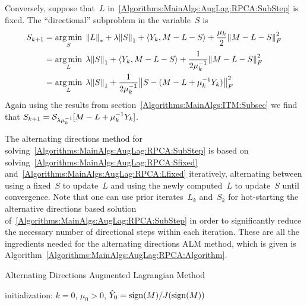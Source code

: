 \documentclass{../../common/projectreport}
\begin{document}
Conversely, suppose that~$L$ in~\eqref{Algorithms:MainAlgs:AugLag:RPCA:SubStep} is fixed. The ``directional'' subproblem in the variable~$S$ is
%
\begin{align}
\begin{split}
S_{k+1} &= \operatorname*{arg\,min}_{S} \; {\left\|L\right\|}_{*}^{} + \lambda {\left\|S\right\|}_{1}^{} + \langle Y_k, M-L-S \rangle + \frac{\mu_k}{2} {\left\|M-L-S\right\|}_{F}^{2} \\
&= \operatorname*{arg\,min}_{L} \; \lambda {\left\|S\right\|}_{1}^{} + \langle Y_k, M-L-S \rangle + \frac{1}{2\mu_k^{-1}} {\left\|M-L-S\right\|}_{F}^{2} \\
&= \operatorname*{arg\,min}_{L} \; \lambda {\left\|S\right\|}_{1}^{} + \frac{1}{2\mu_k^{-1}} {\left\|S-(M-L+\mu_k^{-1}Y_k)\right\|}_{F}^{2} 
\end{split}
\label{Algorithms:MainAlgs:AugLag:RPCA:Lfixed}
\end{align}
%
Again using the results from section~\ref{Algorithms:MainAlgs:ITM:Subsec} we find that $S_{k+1} = {\mathcal{S}}_{\lambda\mu_k^{-1}}[M-L+\mu_k^{-1}Y_k]$. 

The alternating directions method for solving~\eqref{Algorithms:MainAlgs:AugLag:RPCA:SubStep} is based on solving~\eqref{Algorithms:MainAlgs:AugLag:RPCA:Sfixed} and~\eqref{Algorithms:MainAlgs:AugLag:RPCA:Lfixed} iteratively, alternating between using a fixed~$S$ to update~$L$ and using the newly computed~$L$ to update~$S$ until convergence. Note that one can use prior iterates~$L_k$ and~$S_k$ for hot-starting the alternative directions based solution of~\eqref{Algorithms:MainAlgs:AugLag:RPCA:SubStep} in order to significantly reduce the necessary number of directional steps within each iteration. These are all the ingredients needed for the alternating directions ALM method, which is given is Algorithm~\ref{Algorithms:MainAlgs:AugLag:RPCA:Algorithm}.

\begin{algorithm}
\caption{Alternating Directions Augmented Lagrangian Method}
initialization: $k=0$, $\mu_0>0$, ${\hat{Y}}_0 = \operatorname{sign}(M)/J(\operatorname{sign}(M))$\;
\label{Algorithms:MainAlgs:AugLag:RPCA:Algorithm}
\end{algorithm}
\end{document}
